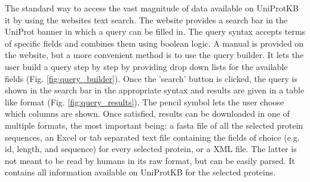 The standard way to access the vast magnitude of data available on UniProtKB it by using the websites text search.
The website provides a search bar in the UniProt banner in which a query can be filled in.
The query syntax accepts terms of specific fields and combines them using boolean logic.
A manual is provided on the website,
but a more convenient method is to use the query builder.
It lets the user build a query step by step by providing drop down lists for the available fields
(Fig. \ref{fig:query_builder}).
Once the 'search' button is clicked, the query is shown in the search bar in the appropriate syntax and results are given in a table like format
(Fig. \ref{fig:query_results}).
The pencil symbol lets the user choose which columns are shown.
Once satisfied, results can be downloaded in one of multiple formats, the most important being:
a fasta file of all the selected protein sequences,
an Excel or tab separated text file containing the fields of choice (e.g. id, length, and sequence) for every selected protein,
or a XML file.
The latter is not meant to be read by humans in its raw format, but can be easily parsed.
It contains all information available on UniProtKB for the selected proteins.



